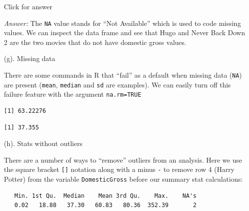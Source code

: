 \documentclass[
]{book}
\newenvironment{Shaded}{\begin{snugshade}}{\end{snugshade}}
\newcommand{\AttributeTok}[1]{\textcolor[rgb]{0.77,0.63,0.00}{#1}}
\newcommand{\ConstantTok}[1]{\textcolor[rgb]{0.00,0.00,0.00}{#1}}
\newcommand{\DecValTok}[1]{\textcolor[rgb]{0.00,0.00,0.81}{#1}}
\newcommand{\FunctionTok}[1]{\textcolor[rgb]{0.00,0.00,0.00}{#1}}
\newcommand{\NormalTok}[1]{#1}
\newcommand{\SpecialCharTok}[1]{\textcolor[rgb]{0.00,0.00,0.00}{#1}}
\begin{document}
Click for answer

\emph{Answer:} The \texttt{NA} value stands for ``Not Available'' which is used to code missing values. We can inspect the data frame and see that Hugo and Never Back Down 2 are the two movies that do not have domestic
gross values.

(g). Missing data

There are some commands in R that ``fail'' as a default when missing data (\texttt{NA}) are present (\texttt{mean}, \texttt{median} and \texttt{sd} are examples). We can easily turn off this failure feature with the argument \texttt{na.rm=TRUE}

\begin{Shaded}
\end{Shaded}

\begin{verbatim}
[1] 63.22276
\end{verbatim}

\begin{Shaded}
\end{Shaded}

\begin{verbatim}
[1] 37.355
\end{verbatim}

(h). Stats without outliers

There are a number of ways to ``remove'' outliers from an analysis. Here we use the square bracket \texttt{{[}{]}} notation along with a minus \texttt{-} to remove row 4 (Harry Potter) from the variable \texttt{DomesticGross} before our summary stat calculations:

\begin{Shaded}
\end{Shaded}

\begin{verbatim}
   Min. 1st Qu.  Median    Mean 3rd Qu.    Max.    NA's 
   0.02   18.88   37.30   60.83   80.36  352.39       2 
\end{verbatim}
\end{document}
